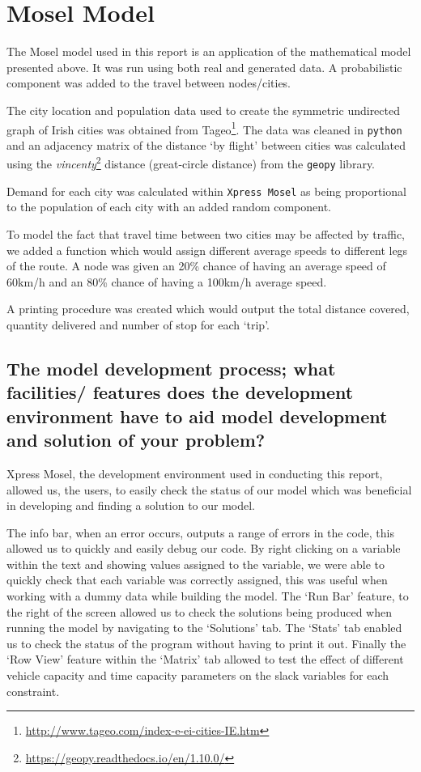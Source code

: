 \documentclass[a4paper,11pt]{article}
\begin{document}
\section{Mosel Model}

The Mosel model used in this report is an application of the mathematical model presented above. It was run using both real and generated data. A probabilistic component was added to the travel between nodes/cities.

The city location and population data used to create the symmetric undirected graph of Irish cities was obtained from Tageo\footnote{\url{http://www.tageo.com/index-e-ei-cities-IE.htm}}. The data was cleaned in \texttt{python} and an adjacency matrix of the distance `by flight' between cities was calculated using the \textit{vincenty}\footnote{\url{https://geopy.readthedocs.io/en/1.10.0/}} distance (great-circle distance) from the \texttt{geopy} library.

Demand for each city was calculated within \texttt{Xpress Mosel} as being proportional to the population of each city with an added random component. 

To model the fact that travel time between two cities may be affected by traffic, we added a function which would assign different average speeds to different legs of the route. A node was given an 20\% chance of having an average speed of 60km/h and an 80\% chance of having a 100km/h average speed.

A printing procedure was created which would output the total distance covered, quantity delivered and number of stop for each `trip'.




\subsection{The model development process; what facilities/ features does the development environment
have to aid model development and solution of your problem? }

Xpress Mosel, the development environment used in conducting this report, allowed us, the users, to easily check the status of our model which was beneficial in developing and finding a solution to our model. 

The info bar, when an error occurs, outputs a range of errors in the code, this allowed us to quickly and easily debug our code. By right clicking on a variable within the text and showing values assigned to the variable, we were able to quickly check that each variable was correctly assigned, this was useful when working with a dummy data while building the model.
The `Run Bar' feature, to the right of the screen allowed us to check the solutions being produced when running the model by navigating to the `Solutions' tab. The `Stats' tab enabled us to check the status of the program without having to print it out. Finally the `Row View' feature within the `Matrix' tab allowed to test the effect of different vehicle capacity and time capacity parameters on the slack variables for each constraint.
\end{document}
